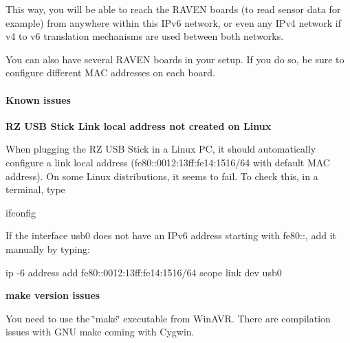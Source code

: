 \-This way, you will be able to reach the \-R\-A\-V\-E\-N boards (to read sensor data for example) from anywhere within this \-I\-Pv6 network, or even any \-I\-Pv4 network if v4 to v6 translation mechanisms are used between both networks.

\-You can also have several \-R\-A\-V\-E\-N boards in your setup. \-If you do so, be sure to configure different \-M\-A\-C addresses on each board.



 \hypertarget{a00058_issues}{}\paragraph{\-Known issues}\label{a00058_issues}
{\bfseries \-R\-Z \-U\-S\-B \-Stick \-Link local address not created on \-Linux}\par


\-When plugging the \-R\-Z \-U\-S\-B \-Stick in a \-Linux \-P\-C, it should automatically configure a link local address (fe80\-:\-:0012\-:13ff\-:fe14\-:1516/64 with default \-M\-A\-C address). \-On some \-Linux distributions, it seems to fail. \-To check this, in a terminal, type \begin{DoxyVerb}
ifconfig
\end{DoxyVerb}
 \-If the interface usb0 does not have an \-I\-Pv6 address starting with fe80\-:\-:, add it manually by typing\-: \begin{DoxyVerb}
ip -6 address add fe80::0012:13ff:fe14:1516/64 scope link dev usb0
\end{DoxyVerb}


{\bfseries make version issues}\par
 \-You need to use the \char`\"{}make\char`\"{} executable from \-Win\-A\-V\-R. \-There are compilation issues with \-G\-N\-U make coming with \-Cygwin.



